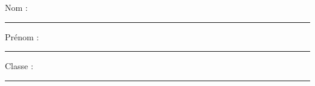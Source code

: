 \documentclass[../Cours.tex]{subfiles}
\begin{document}
\clearpage
\thispagestyle{empty}



\newcommand{\bionic}[2][0.5]{%
\StrCut{#2}{ }{\nextword}{\otherwords}%
\exploregroups%
\StrLen{\nextword}[\currlen]%
\edef\halflen{\fpeval{ceil(\currlen*#1)}}%
\bfseries\StrLeft{\nextword}{\halflen}%
\normalfont\StrGobbleLeft{\nextword}{\halflen}\space%
\noexploregroups%
\IfStrEq{\otherwords}{}{}{%
\bionic[#1]{\otherwords}%
}}

\setcounter{DS}{1}

\newcommand{\nomPrenom}{%
    Nom : \rule{2cm}{1pt}  \hfill Prénom : \rule{2cm}{1pt} \hfill Classe : \rule{2cm}{1pt}
}

\newcommand{\caseReponse}[1]{%
    \begin{center}
    \begin{tikzpicture}
        \draw (0,0) rectangle (\textwidth,#1);
    \end{tikzpicture}
    \end{center}
}

\color{black}
\nomPrenom
\titreDS
\end{document}
